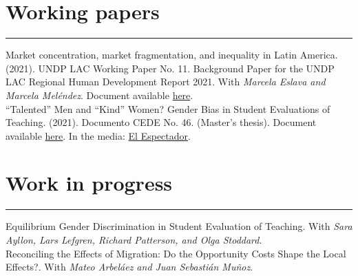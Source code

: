 \documentclass[12pt, letterpaper]{article}
\begin{document}
\vspace*{-2mm}

\section*{Working papers}
\vspace*{-8mm}
\noindent \rule{\linewidth}{0.2mm}
\noindent Market concentration, market fragmentation, and inequality in Latin America. (2021). UNDP LAC Working Paper No. 11. Background Paper for the UNDP LAC Regional Human Development Report 2021.  With \textit{Marcela Eslava and Marcela Meléndez}. Document available \href{https://www.latinamerica.undp.org/content/rblac/en/home/library/poverty/market-concentration--market-fragmentation--and-inequality-in-la.html}{here}. \\ [-3mm]

\noindent ``Talented'' Men and ``Kind'' Women? Gender Bias in Student Evaluations of Teaching. (2021). Documento CEDE No. 46. (Master's thesis). Document available \href{https://papers.ssrn.com/sol3/papers.cfm?abstract_id=3919797}{here}. In the media: \href{https://www.elespectador.com/educacion/los-profes-crack-y-las-profes-amables-el-sesgo-de-genero-en-las-aulas/}{El Espectador}.

\vspace{-5mm}

\section*{Work in progress}
\vspace*{-8mm}
\noindent \rule{\linewidth}{0.2mm}
\noindent Equilibrium Gender Discrimination in Student Evaluation of Teaching. With \textit{Sara Ayllon, Lars Lefgren, Richard Patterson, and Olga Stoddard}. \\ [-3mm]

\noindent Reconciling the Effects of Migration: Do the Opportunity Costs Shape the Local Effects?. With \textit{Mateo Arbeláez and Juan Sebastián Muñoz}. \\ [-3mm]

\vspace{-7mm}

\end{document}
